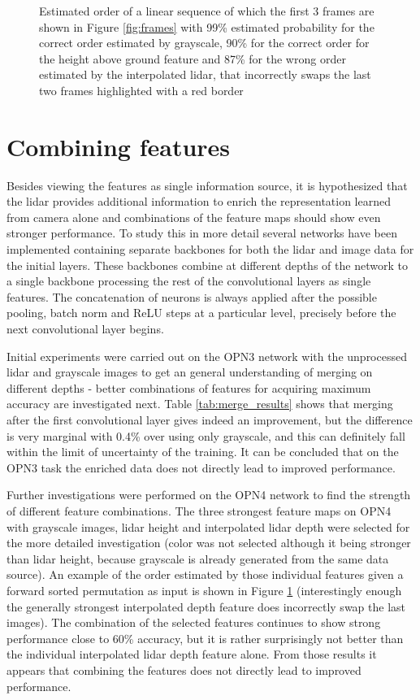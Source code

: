 \begin{figure}[t!]
\caption{Estimated order of a linear sequence of which the first 3 frames are shown in Figure \ref{fig:frames} with 99\% estimated probability for the correct order estimated by grayscale, 90\% for the correct order for the height above ground feature and 87\% for the wrong order estimated by the interpolated lidar, that incorrectly swaps the last two frames highlighted with a red border}
\label{fig:orderings}
\end{figure}

\section{Combining features}
Besides viewing the features as single information source, it is hypothesized that the lidar provides additional information to enrich the representation learned from camera alone and combinations of the feature maps should show even stronger performance. To study this in more detail several networks have been implemented containing separate backbones for both the lidar and image data for the initial layers. These backbones combine at different depths of the network to a single backbone processing the rest of the convolutional layers as single features. The concatenation of neurons is always applied after the possible pooling, batch norm and ReLU steps at a particular level, precisely before the next convolutional layer begins.

Initial experiments were carried out on the OPN3 network with the unprocessed lidar and grayscale images to get an general understanding of merging on different depths - better combinations of features for acquiring maximum accuracy are investigated next. Table \ref{tab:merge_results} shows that merging after the first convolutional layer gives indeed an improvement, but the difference is very marginal with 0.4\% over using only grayscale, and this can definitely fall within the limit of uncertainty of the training. It can be concluded that on the OPN3 task the enriched data does not directly lead to improved performance. 

Further investigations were performed on the OPN4 network to find the strength of different feature combinations. The three strongest feature maps on OPN4 with grayscale images, lidar height and interpolated lidar depth were selected for the more detailed investigation (color was not selected although it being stronger than lidar height, because grayscale is already generated from the same data source). An example of the order estimated by those individual features given a forward sorted permutation as input is shown in Figure \ref{fig:orderings} (interestingly enough the generally strongest interpolated depth feature does incorrectly swap the last images). The combination of the selected features continues to show strong performance close to 60\% accuracy, but it is rather surprisingly not better than the individual interpolated lidar depth feature alone. From those results it appears that combining the features does not directly lead to improved performance. 

